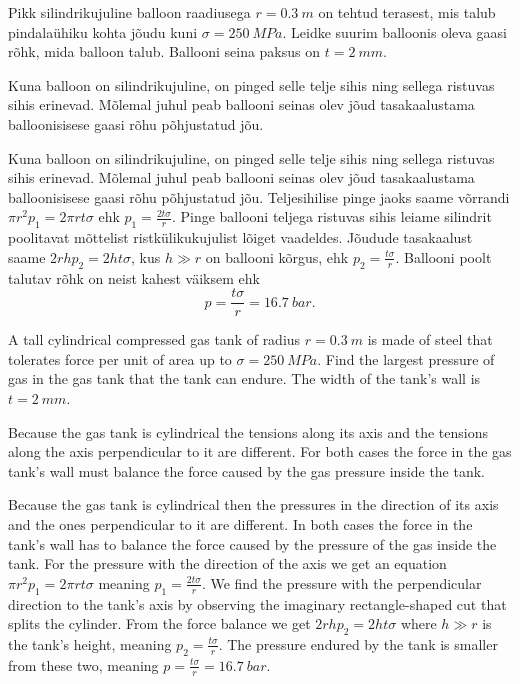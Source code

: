 
Pikk silindrikujuline balloon raadiusega $r=\SI{0,3}{m}$ on tehtud terasest, mis talub pindalaühiku kohta jõudu kuni $\sigma=\SI{250}{MPa}$. Leidke suurim balloonis oleva gaasi rõhk, mida balloon talub. Ballooni seina paksus on $t=\SI{2}{mm}$.

\hint
Kuna balloon on silindrikujuline, on pinged selle telje sihis ning sellega ristuvas sihis erinevad. Mõlemal juhul peab ballooni seinas olev jõud tasakaalustama balloonisisese gaasi rõhu põhjustatud jõu.

\solu
Kuna balloon on silindrikujuline, on pinged selle telje sihis ning sellega ristuvas sihis erinevad. Mõlemal juhul peab ballooni seinas olev jõud tasakaalustama balloonisisese gaasi rõhu põhjustatud jõu. Teljesihilise pinge jaoks saame võrrandi $\pi r^2 p_1=2\pi rt\sigma$ ehk $p_1=\frac{2t\sigma}{r}$. Pinge ballooni teljega ristuvas sihis leiame silindrit poolitavat mõttelist ristkülikukujulist lõiget vaadeldes. Jõudude tasakaalust saame $2rhp_2=2ht\sigma$, kus $h\gg r$ on ballooni kõrgus, ehk $p_2=\frac{t\sigma}{r}$. Ballooni poolt talutav rõhk on neist kahest väiksem ehk
\[
p=\frac{t\sigma}{r}=\SI{16,7}{bar}.
\]

A tall cylindrical compressed gas tank of radius $r=\SI{0,3}{m}$ is made of steel that tolerates force per unit of area up to $\sigma=\SI{250}{MPa}$. Find the largest pressure of gas in the gas tank that the tank can endure. The width of the tank’s wall is $t=\SI{2}{mm}$.

\hinteng
Because the gas tank is cylindrical the tensions along its axis and the tensions along the axis perpendicular to it are different. For both cases the force in the gas tank’s wall must balance the force caused by the gas pressure inside the tank.

\solueng
Because the gas tank is cylindrical then the pressures in the direction of its axis and the ones perpendicular to it are different. In both cases the force in the tank’s wall has to balance the force caused by the pressure of the gas inside the tank. For the pressure with the direction of the axis we get an equation $\pi r^2 p_1=2\pi rt\sigma$ meaning $p_1=\frac{2t\sigma}{r}$. We find the pressure with the perpendicular direction to the tank’s axis by observing the imaginary rectangle-shaped cut that splits the cylinder. From the force balance we get $2rhp_2=2ht\sigma$ where $h\gg r$ is the tank’s height, meaning $p_2=\frac{t\sigma}{r}$. The pressure endured by the tank is smaller from these two, meaning $p=\frac{t\sigma}{r}=\SI{16,7}{bar}$.
\probend